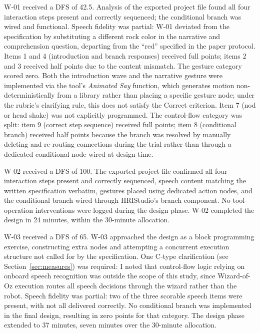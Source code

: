 W-01 received a DFS of 42.5. Analysis of the exported project file found all four interaction steps present and correctly sequenced; the conditional branch was wired and functional. Speech fidelity was partial: W-01 deviated from the specification by substituting a different rock color in the narrative and comprehension question, departing from the ``red'' specified in the paper protocol. Items 1 and 4 (introduction and branch responses) received full points; items 2 and 3 received half points due to the content mismatch. The gesture category scored zero. Both the introduction wave and the narrative gesture were implemented via the tool's \emph{Animated Say} function, which generates motion non-deterministically from a library rather than placing a specific gesture node; under the rubric's clarifying rule, this does not satisfy the Correct criterion. Item 7 (nod or head shake) was not explicitly programmed. The control-flow category was split: item 9 (correct step sequence) received full points; item 8 (conditional branch) received half points because the branch was resolved by manually deleting and re-routing connections during the trial rather than through a dedicated conditional node wired at design time.

W-02 received a DFS of 100. The exported project file confirmed all four interaction steps present and correctly sequenced, speech content matching the written specification verbatim, gestures placed using dedicated action nodes, and the conditional branch wired through HRIStudio's branch component. No tool-operation interventions were logged during the design phase. W-02 completed the design in 24 minutes, within the 30-minute allocation.

W-03 received a DFS of 65. W-03 approached the design as a block programming exercise, constructing extra nodes and attempting a concurrent execution structure not called for by the specification. One C-type clarification (see Section~\ref{sec:measures}) was required: I noted that control-flow logic relying on onboard speech recognition was outside the scope of this study, since Wizard-of-Oz execution routes all speech decisions through the wizard rather than the robot. Speech fidelity was partial: two of the three scorable speech items were present, with not all delivered correctly. No conditional branch was implemented in the final design, resulting in zero points for that category. The design phase extended to 37 minutes, seven minutes over the 30-minute allocation.

